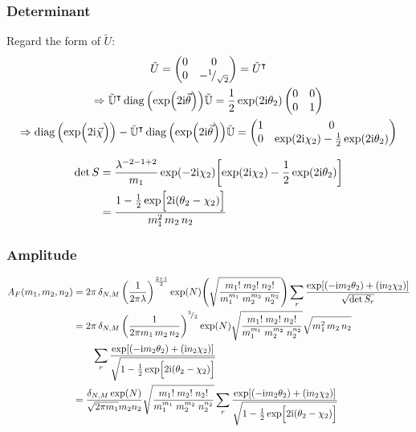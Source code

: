 \documentclass[
	english,
	a4paper,
	fontsize=10pt,
	parskip=half,
	titlepage=true,
	DIV=12,
	final
]{scrreprt}
\newcommand*{\Thus}{\ensuremath{\Rightarrow}\xspace}
\newcommand*{\smallfrac}  [2]{\ensuremath{{}^        {#1} \!/_        {#2}}}
\newcommand*{\transp}{\ensuremath{^\intercal}}
\newcommand*{\iunit}{\ensuremath{\mathrm{i}}}
\DeclareMathOperator{\diag}{diag}
\begin{document}
\subsubsection{Determinant}
Regard the form of $\tilde{U}$:
\begin{gather}
	\tilde{U}
=
	\begin{pmatrix}
		0 & 0 \\ 0 & -\smallfrac{1}{\sqrt{2}}
	\end{pmatrix}
=
	\tilde{U}\transp
\\
	\Thus
	\tilde{\mathbb{U}}\transp
	\diag\qty(\exp(2\iunit\vec{\theta}))
	\tilde{\mathbb{U}}
=
	\frac{1}{2} \exp(2\iunit \theta_2)
	\begin{pmatrix}
		0 & 0 \\ 0 & 1
	\end{pmatrix}
\\
	\Thus
	\diag\qty( \exp(\Big.2\iunit\vec{\chi}) )
	-
	\tilde{\mathbb{U}}\transp
	\diag\qty(\exp(2\iunit\vec{\theta}))
	\tilde{\mathbb{U}}
=
	\begin{pmatrix}
		1 & 0 \\
		0 & \exp(2\iunit \chi_2) - \frac{1}{2} \exp(2\iunit \theta_2)
	\end{pmatrix}	
\end{gather}

\begin{align}
	\det S
&=
	\frac{ \lambda^{-2 - 1 + 2} }{ m_1 }
	\exp(-2\iunit \chi_2)
	\qty[ 
		\exp(2\iunit \chi_2) - \frac{1}{2} \exp(2\iunit \theta_2)
	] \\
&=
	\frac
		{1 - \frac{1}{2} \exp[\Big. 2\iunit (\theta_2 - \chi_2)]}
		{m_1^2 \, m_2 \, n_2}
\end{align}

\subsubsection{Amplitude}
\begin{align}
	A_F(m_1, m_2, n_2)
&=
	2\pi \, \delta_{N,M} \, \qty(
		\frac{1}{2\pi\lambda}
	)^{\frac{2 + 1}{2}}
	\exp(N)
	\qty(
		\sqrt{\frac
			{ m_1!      \; m_2!     \; n_2! }
			{ m_1^{m_1} \;m_2^{m_2} \; n_2^{n_2} }
	})
	\sum_r
		\frac
		{\exp[
			\qty(- \iunit m_2 \theta_2) + 
			\qty(  \iunit n_2 \chi  _2)
		]}
		{\sqrt{\det S_r}}
	\\
&=
\nonumber
	2\pi \, \delta_{N,M} \, \qty(
		\frac{1}{2\pi m_1 \, m_2 \, n_2}
	)^{\smallfrac{3}{2}}
	\exp(N)
	\sqrt{\frac
		{ m_1!      \; m_2!     \; n_2! }
		{ m_1^{m_1} \;m_2^{m_2} \; n_2^{n_2} }
	}
	\sqrt{m_1^2 \, m_2 \, n_2}
\\ &\qquad
	\sum_r
		\frac
		{\exp[
			\qty(- \iunit m_2 \theta_2) + 
			\qty(  \iunit n_2 \chi  _2)
		]}
		{\sqrt{1 - \frac{1}{2} \exp[\Big. 2\iunit (\theta_2 - \chi_2)]}}
	\\
&=
	\frac
		{\delta_{N,M} \exp(N)}
		{\sqrt{2\pi m_1} m_2 n_2}
	\sqrt{\frac
		{ m_1!      \; m_2!     \; n_2! }
		{ m_1^{m_1} \;m_2^{m_2} \; n_2^{n_2} }
	}
	\sum_r \frac
		{\exp[
			\qty(- \iunit m_2 \theta_2) + 
			\qty(  \iunit n_2 \chi  _2)
		]}
		{\sqrt{1 - \frac{1}{2} \exp[\Big. 2\iunit (\theta_2 - \chi_2)]}}
\end{align}
\end{document}
